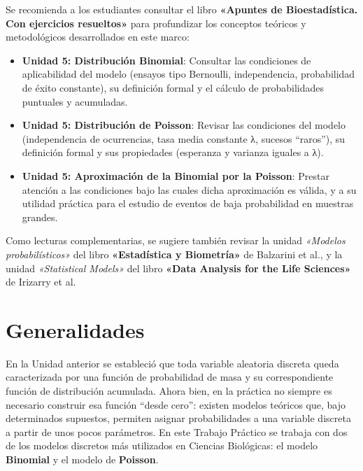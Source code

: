 \documentclass[
  spanish,
  letterpaper,
  DIV=11,
  numbers=noendperiod]{scrreprt}
\providecommand{\tightlist}{%
  \setlength{\itemsep}{0pt}\setlength{\parskip}{0pt}}
\begin{document}
\begin{tcolorbox}[enhanced jigsaw, arc=.35mm, bottomrule=.15mm, bottomtitle=1mm, breakable, colback=white, colbacktitle=quarto-callout-important-color!10!white, colframe=quarto-callout-important-color-frame, coltitle=black, left=2mm, leftrule=.75mm, opacityback=0, opacitybacktitle=0.6, rightrule=.15mm, title=\textcolor{quarto-callout-important-color}{\faExclamation}\hspace{0.5em}{Lectura Sugerida para el Trabajo Práctico}, titlerule=0mm, toprule=.15mm, toptitle=1mm]

Se recomienda a los estudiantes consultar el libro \textbf{«Apuntes de
Bioestadística. Con ejercicios resueltos»} para profundizar los
conceptos teóricos y metodológicos desarrollados en este marco:

\begin{itemize}
\tightlist
\item
  \textbf{Unidad 5: Distribución Binomial}: Consultar las condiciones de
  aplicabilidad del modelo (ensayos tipo Bernoulli, independencia,
  probabilidad de éxito constante), su definición formal y el cálculo de
  probabilidades puntuales y acumuladas.
\item
  \textbf{Unidad 5: Distribución de Poisson}: Revisar las condiciones
  del modelo (independencia de ocurrencias, tasa media constante λ,
  sucesos ``raros''), su definición formal y sus propiedades (esperanza
  y varianza iguales a λ).
\item
  \textbf{Unidad 5: Aproximación de la Binomial por la Poisson}: Prestar
  atención a las condiciones bajo las cuales dicha aproximación es
  válida, y a su utilidad práctica para el estudio de eventos de baja
  probabilidad en muestras grandes.
\end{itemize}

Como lecturas complementarias, se sugiere también revisar la unidad
\emph{«Modelos probabilísticos»} del libro \textbf{«Estadística y
Biometría»} de Balzarini et al., y la unidad \emph{«Statistical Models»}
del libro \textbf{«Data Analysis for the Life Sciences»} de Irizarry et
al.

\end{tcolorbox}

\section{Generalidades}\label{generalidades-1}

En la Unidad anterior se estableció que toda variable aleatoria discreta
queda caracterizada por una función de probabilidad de masa y su
correspondiente función de distribución acumulada. Ahora bien, en la
práctica no siempre es necesario construir esa función ``desde cero'':
existen modelos teóricos que, bajo determinados supuestos, permiten
asignar probabilidades a una variable discreta a partir de unos pocos
parámetros. En este Trabajo Práctico se trabaja con dos de los modelos
discretos más utilizados en Ciencias Biológicas: el modelo
\textbf{Binomial} y el modelo de \textbf{Poisson}.
\end{document}
